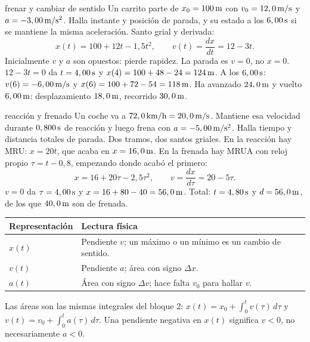 \documentclass[11pt,a4paper]{article}
\begin{document}
\begin{examplebox}{frenar y cambiar de sentido}
 Un carrito parte de $x_0=100\,\mathrm{m}$ con
$v_0=12,0\,\mathrm{m/s}$ y $a=-3,00\,\mathrm{m/s^2}$. Halla instante y posici\'on de parada,
y su estado a los $6,00\,\mathrm{s}$ si se mantiene la misma aceleraci\'on.
\solutionblock
{} Santo grial y derivada:
\[
x(t)=100+12t-1,5t^2,\qquad v(t)=\frac{dx}{dt}=12-3t.
\]
Inicialmente $v$ y $a$ son opuestos: pierde rapidez. La parada es $v=0$, no $x=0$.
 $12-3t=0$ da $t=4,00\,\mathrm{s}$ y $x(4)=100+48-24=124\,\mathrm{m}$.
A los $6,00\,\mathrm{s}$: $v(6)=-6,00\,\mathrm{m/s}$ y $x(6)=100+72-54=118\,\mathrm{m}$.
 Ha avanzado $24,0\,\mathrm{m}$ y vuelto $6,00\,\mathrm{m}$:
desplazamiento $18,0\,\mathrm{m}$, recorrido $30,0\,\mathrm{m}$.
\end{examplebox}

\begin{examplebox}{reacci\'on y frenado}
 Un coche va a $72,0\,\mathrm{km/h}=20,0\,\mathrm{m/s}$.
Mantiene esa velocidad durante $0,800\,\mathrm{s}$ de reacci\'on y luego
frena con $a=-5,00\,\mathrm{m/s^2}$. Halla tiempo y distancia totales de parada.
\solutionblock
{} Dos tramos, dos santos griales. En la reacci\'on hay MRU: $x=20t$, que acaba
en $x=16,0\,\mathrm{m}$. En la frenada hay MRUA con reloj propio $\tau=t-0,8$, empezando
donde acab\'o el primero:
\[
x=16+20\tau-2,5\tau^2,\qquad v=\frac{dx}{d\tau}=20-5\tau.
\]
 $v=0$ da $\tau=4,00\,\mathrm{s}$ y $x=16+80-40=56,0\,\mathrm{m}$.
Total: $t=4,80\,\mathrm{s}$ y $d=56,0\,\mathrm{m}$, de los que $40,0\,\mathrm{m}$ son de frenada.
\end{examplebox}

\begin{tabularx}{\linewidth}{@{}p{2.7cm}Y@{}}
\toprule
Representaci\'on & Lectura f\'isica\\
\midrule
$x(t)$ & Pendiente $v$; un m\'aximo o un m\'inimo es un cambio de sentido.\\
$v(t)$ & Pendiente $a$; \'area con signo $\Delta x$.\\
$a(t)$ & \'Area con signo $\Delta v$; hace falta $v_0$ para hallar $v$.\\
\bottomrule
\end{tabularx}
Las \'areas son las mismas integrales del bloque 2:
$x(t)=x_0+\int_0^t v(\tau)\,d\tau$ y $v(t)=v_0+\int_0^t a(\tau)\,d\tau$.
Una pendiente negativa en $x(t)$ significa $v<0$, no necesariamente $a<0$.
\end{document}
